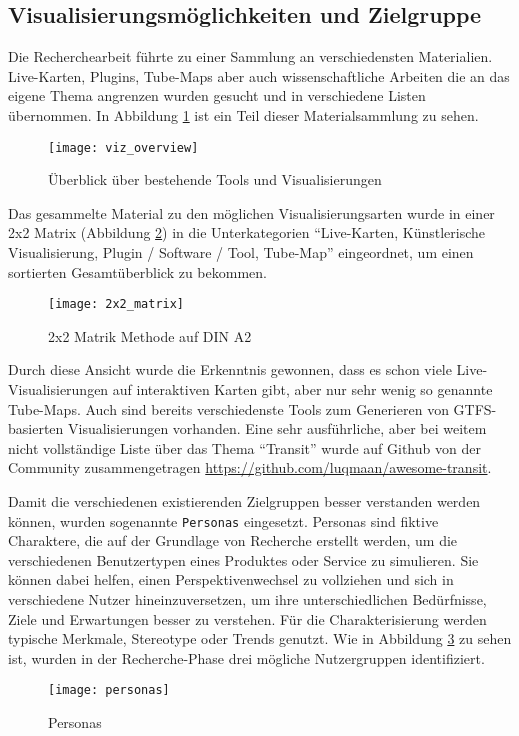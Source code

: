 \subsection{Visualisierungsmöglichkeiten und Zielgruppe}
\label{sub:visualisierungsmöglichkeiten_und_zielgruppe}
  Die Recherchearbeit führte  zu einer Sammlung an verschiedensten Materialien. Live-Karten, Plugins, Tube-Maps aber auch wissenschaftliche Arbeiten die an das eigene Thema angrenzen wurden gesucht und in verschiedene Listen übernommen. In Abbildung \ref{fig:viz_overview} ist ein Teil dieser Materialsammlung zu sehen.

  \begin{figure}[htbp]
    \begin{center}
      \texttt{[image: viz\_overview]}
      \caption{Überblick über bestehende Tools und Visualisierungen}
      \label{fig:viz_overview}
    \end{center}
  \end{figure}

  Das gesammelte Material zu den möglichen Visualisierungsarten wurde in einer 2x2 Matrix (Abbildung \ref{fig:2x2_matrix}) in die Unterkategorien "`Live-Karten, Künstlerische Visualisierung, Plugin / Software / Tool, Tube-Map"' eingeordnet, um einen sortierten Gesamtüberblick zu bekommen. 

  \begin{figure}[htbp]
    \begin{center}
      \texttt{[image: 2x2\_matrix]}
      \caption{2x2 Matrik Methode auf DIN A2}
      \label{fig:2x2_matrix}
    \end{center}
  \end{figure}

  Durch diese Ansicht wurde die Erkenntnis gewonnen, dass es schon viele Live-Visualisierungen auf interaktiven Karten gibt, aber nur sehr wenig so genannte Tube-Maps. Auch sind bereits verschiedenste Tools zum Generieren von GTFS-basierten Visualisierungen vorhanden. Eine sehr ausführliche, aber bei weitem nicht vollständige Liste über das Thema "`Transit"' wurde auf Github von der Community zusammengetragen \url{https://github.com/luqmaan/awesome-transit}.

  Damit die verschiedenen existierenden Zielgruppen besser verstanden werden können, wurden sogenannte \texttt{Personas} eingesetzt\parencite{personas}. Personas sind fiktive Charaktere, die auf der Grundlage von Recherche erstellt werden, um die verschiedenen Benutzertypen eines Produktes oder Service zu simulieren. Sie können dabei helfen, einen Perspektivenwechsel zu vollziehen und sich in verschiedene Nutzer hineinzuversetzen, um ihre unterschiedlichen Bedürfnisse, Ziele und Erwartungen besser zu verstehen.
  Für die Charakterisierung werden typische Merkmale, Stereotype oder Trends genutzt. Wie in Abbildung \ref{fig:personas} zu sehen ist, wurden in der Recherche-Phase drei mögliche Nutzergruppen identifiziert.

  \begin{figure}[htbp]
    \begin{center}
      \texttt{[image: personas]}
      \caption{Personas}
      \label{fig:personas}
    \end{center}
  \end{figure}

